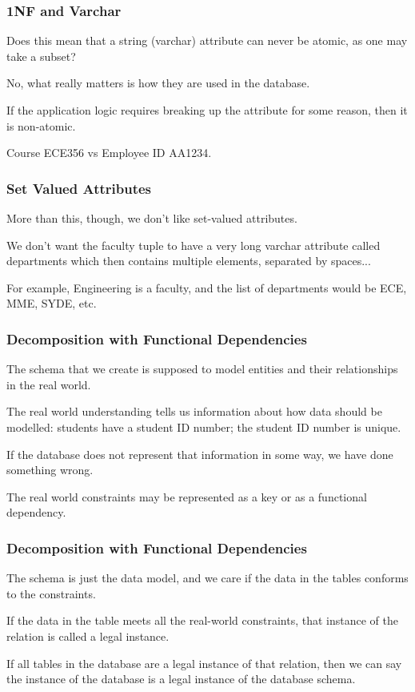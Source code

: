 \begin{frame}
\frametitle{1NF and Varchar}

Does this mean that a string (varchar) attribute can never be atomic, as one may take a subset? 

No, what really matters is how they are used in the database. 

If the application logic requires breaking up the attribute for some reason, then it is non-atomic. 

Course ECE356 vs Employee ID AA1234.

\end{frame}



\begin{frame}
\frametitle{Set Valued Attributes}

More than this, though, we don't like set-valued attributes. 

We don't want the faculty tuple to have a very long varchar attribute called departments which then contains multiple elements, separated by spaces... 

For example, Engineering is a faculty, and the list of departments would be ECE, MME, SYDE, etc. 

\end{frame}



\begin{frame}
\frametitle{Decomposition with Functional Dependencies}

The schema that we create is supposed to model entities and their relationships in the real world. 

The real world understanding tells us information about how data should be modelled: students have a student ID number; the student ID number is unique. 

If the database does not represent that information in some way, we have done something wrong. 

The real world constraints may be represented as a key or as a functional dependency.

\end{frame}

\begin{frame}
\frametitle{Decomposition with Functional Dependencies}

The schema is just the data model, and we care if the data in the tables conforms to the constraints. 

If the data in the table meets all the real-world constraints, that instance of the relation is called a \alert{legal instance}. 

If all tables in the database are a legal instance of that relation, then we can say the instance of the database is a legal instance of the database schema.

\end{frame}



